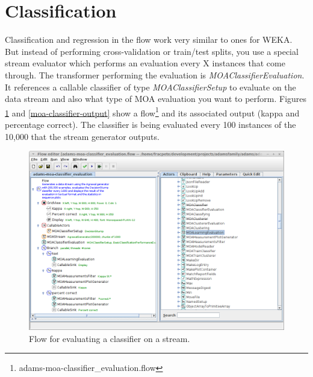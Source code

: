 \documentclass[a4paper]{book}
\begin{document}
\clearpage
\newpage
\section{Classification}
Classification and regression in the flow work very similar to ones for WEKA.
But instead of performing cross-validation or train/test splits, you use a
special stream evaluator which performs an evaluation every X instances that
come through. The transformer performing the evaluation is 
\textit{MOAClassifierEvaluation}. It references a callable classifier of type 
\textit{MOAClassifierSetup} to evaluate on the data stream and also what type of MOA 
evaluation you want to perform.
Figures \ref{moa-classifier-flow} and \ref{moa-classifier-output} show a 
flow\footnote{adams-moa-classifier\_evaluation.flow} 
and its associated output (kappa and percentage correct). The classifier is 
being evaluated every 100 instances of the 10,000 that the stream generator 
outputs.

\begin{figure}[htb]
  \centering
  \includegraphics[width=12.0cm]{images/moa-classifier-flow.png}
  \caption{Flow for evaluating a classifier on a stream.}
  \label{moa-classifier-flow}
\end{figure}
\end{document}
